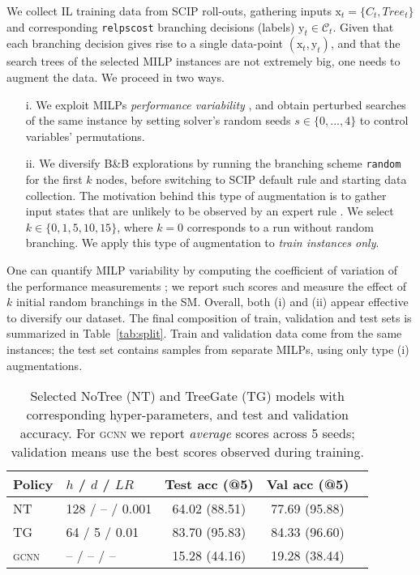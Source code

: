\documentclass[letterpaper]{article} %
\begin{document}
{
We collect IL training data from SCIP roll-outs, gathering inputs $\mathrm{x}_t = \{C_t, \mathit{Tree}_t\}$ and corresponding \texttt{relpscost} branching decisions (labels) $\mathrm{y}_t \in\mathcal{C}_t$.
Given that each branching decision gives rise to a single data-point $(\mathrm{x}_t, \mathrm{y}_t)$, and that the search trees of the selected MILP instances are not extremely big, one needs to augment the data.
We proceed in two ways.
\begin{enumerate}[align=left]
    \item[i.] We exploit MILPs \emph{performance variability} \cite{LT13}, and obtain perturbed searches of the same instance by setting solver's random seeds $s\in\{0,...,4\}$ to control variables' permutations.

    \item[ii.] We diversify B\&B explorations by running the branching scheme \texttt{random} for the first $k$ nodes, before switching to SCIP default rule and starting data collection.
    The motivation behind this type of augmentation is to gather input states that are unlikely to be observed by an expert rule \cite{LearningToSearch}.
    We select $k\in\{0, 1, 5, 10, 15\}$, where $k=0$ corresponds to a run without random branching. We apply this type of augmentation to \emph{train instances only}.
\end{enumerate}
One can quantify MILP variability by computing the coefficient of variation of the performance measurements \cite{MIPLIB2010};
we report such scores and measure the effect of $k$ initial random branchings in the SM.
Overall, both (i) and (ii) appear effective to diversify our dataset.
The final composition of train, validation and test sets is summarized in Table~\ref{tab:split}.
Train and validation data come from the same instances; the test set contains samples from separate MILPs, using only type (i) augmentations.

\begin{table}[!t]
    \centering
    \begin{footnotesize}
    \begin{tabular}{llccc}
        \toprule
           Policy & $h$ / $d$ / $\mathit{LR}$ & Test acc (@5) & Val acc (@5) \\
        \toprule
            NT & 128 / -- / 0.001 & 64.02 (88.51) & 77.69 (95.88) \\
            TG & 64 / 5 / 0.01 & 83.70 (95.83) & 84.33 (96.60)  \\
        \midrule
            \textsc{gcnn} &  -- / -- / --  & 15.28 (44.16) & 19.28 (38.44)  \\
        \bottomrule
    \end{tabular}
    \end{footnotesize}
    \caption{Selected NoTree (NT) and TreeGate (TG) models with corresponding hyper-parameters, and test and validation accuracy. For \textsc{gcnn} we report \emph{average} scores across 5 seeds; validation means use the best scores observed during training.}
    \label{tab:best_policies_gcnn}
\end{table}

}
\end{document}

